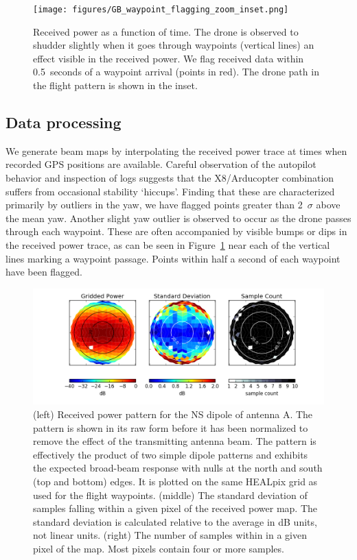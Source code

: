 \documentclass[preprint2,numberedappendix,tighten,twocolappendix]{aastex6}
\begin{document}
\begin{figure}[htb]
\texttt{[image: figures/GB\_waypoint\_flagging\_zoom\_inset.png]}
\caption{Received power as a function of time. The drone is observed to shudder slightly when it goes through waypoints (vertical lines) an effect visible in the received power. We flag received data within 0.5~seconds of a waypoint arrival (points in red). The drone path in the flight pattern is shown in the inset.}
\label{fig:waypoint_flagging}
\end{figure}


\subsection{Data processing}
\label{sec:processing}

We generate beam maps by interpolating the received power trace at times when recorded GPS positions are available.  Careful observation of the autopilot behavior and inspection of logs suggests that the X8/Arducopter combination suffers from occasional stability `hiccups'. Finding that these are characterized primarily by outliers in the yaw, we have flagged points greater than 2~$\sigma$ above the mean yaw.  Another slight yaw outlier is observed to occur as the drone passes through each waypoint.  These are often accompanied by visible bumps or dips in the received power trace, as can be seen in Figure~\ref{fig:waypoint_flagging} near each of the vertical lines marking a waypoint passage.  Points within half a second of each waypoint have been flagged. 


\begin{figure}[ht]
\begin{center}
\includegraphics[width=\textwidth]{figures/GB_power_rms_count.png}
\caption{(left) Received power pattern for the NS dipole of antenna A.  The pattern is shown in its raw form before it has been normalized to remove the effect of the transmitting antenna beam.  The pattern is effectively the product of two simple dipole patterns and exhibits the expected broad-beam response with nulls at the north and south (top and bottom) edges.  It is plotted on the same HEALpix grid as used for the flight waypoints.   (middle) The standard deviation of samples falling within a given pixel of the received power map. The standard deviation is calculated relative to the average in dB units, not linear units.   (right) The number of samples within in a given pixel of the map. Most pixels contain four or more samples.}
\label{fig:beam_std_count}
\end{center}
\end{figure}
\end{document}
